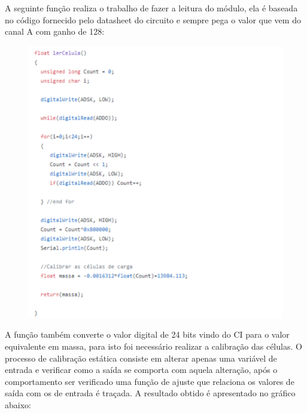 A seguinte função realiza o trabalho de fazer a leitura do módulo, ela é baseada no código fornecido pelo datasheet do circuito e sempre pega o valor que vem do canal A com ganho de 128:

\begin{figure}[!h]
\centering \includegraphics[scale=0.9]{figuras/hx711_codigo}

\label{hx711codigo}
\end{figure}

\pagebreak

A função também converte o valor digital de 24 bits vindo do CI para o valor equivalente em massa, para isto foi necessário realizar a calibração das células. O processo de calibração estática consiste em alterar apenas uma variável de entrada e verificar como a saída se comporta com aquela alteração, após o comportamento ser verificado uma função de ajuste que relaciona os valores de saída com os de entrada é traçada. A resultado obtido é apresentado no gráfico abaixo:

